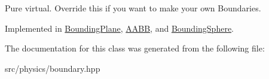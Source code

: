 Pure virtual. Override this if you want to make your own Boundaries. 

Implemented in \mbox{\hyperlink{class_bounding_plane_a3d956121121f32384cab3cab34544d6e}{Bounding\+Plane}}, \mbox{\hyperlink{class_a_a_b_b_ab427a4455732a16802103e06ed4af02a}{A\+A\+BB}}, and \mbox{\hyperlink{class_bounding_sphere_aab64d759fac6a9835ac24d6fca8530d6}{Bounding\+Sphere}}.



The documentation for this class was generated from the following file\+:\begin{DoxyCompactItemize}
\item 
src/physics/boundary.\+hpp\end{DoxyCompactItemize}
